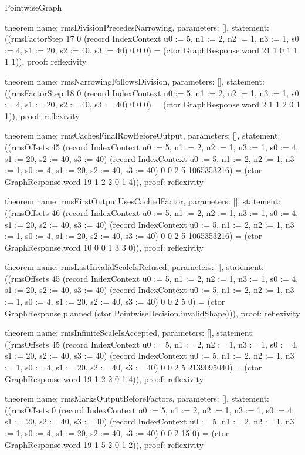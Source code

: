 \begin{lexlean}{PointwiseGraph}
\begin{semanticmodule}
theorem{
  name: rmsDivisionPrecedesNarrowing,
  parameters: [],
  statement: ((rmsFactorStep 17 0 (record IndexContext {u0 := 5, n1 := 2, n2 := 1, n3 := 1, s0 := 4, s1 := 20, s2 := 40, s3 := 40}) 0 0 0) = (ctor GraphResponse.word 21 1 0 1 1 1 1)),
  proof: reflexivity{}
}

theorem{
  name: rmsNarrowingFollowsDivision,
  parameters: [],
  statement: ((rmsFactorStep 18 0 (record IndexContext {u0 := 5, n1 := 2, n2 := 1, n3 := 1, s0 := 4, s1 := 20, s2 := 40, s3 := 40}) 0 0 0) = (ctor GraphResponse.word 2 1 1 2 0 1 1)),
  proof: reflexivity{}
}

theorem{
  name: rmsCachesFinalRowBeforeOutput,
  parameters: [],
  statement: ((rmsOffsets 45 (record IndexContext {u0 := 5, n1 := 2, n2 := 1, n3 := 1, s0 := 4, s1 := 20, s2 := 40, s3 := 40}) (record IndexContext {u0 := 5, n1 := 2, n2 := 1, n3 := 1, s0 := 4, s1 := 20, s2 := 40, s3 := 40}) 0 0 2 5 1065353216) = (ctor GraphResponse.word 19 1 2 2 0 1 4)),
  proof: reflexivity{}
}

theorem{
  name: rmsFirstOutputUsesCachedFactor,
  parameters: [],
  statement: ((rmsOffsets 46 (record IndexContext {u0 := 5, n1 := 2, n2 := 1, n3 := 1, s0 := 4, s1 := 20, s2 := 40, s3 := 40}) (record IndexContext {u0 := 5, n1 := 2, n2 := 1, n3 := 1, s0 := 4, s1 := 20, s2 := 40, s3 := 40}) 0 0 2 5 1065353216) = (ctor GraphResponse.word 10 0 0 1 3 3 0)),
  proof: reflexivity{}
}

theorem{
  name: rmsLastInvalidScaleIsRefused,
  parameters: [],
  statement: ((rmsOffsets 45 (record IndexContext {u0 := 5, n1 := 2, n2 := 1, n3 := 1, s0 := 4, s1 := 20, s2 := 40, s3 := 40}) (record IndexContext {u0 := 5, n1 := 2, n2 := 1, n3 := 1, s0 := 4, s1 := 20, s2 := 40, s3 := 40}) 0 0 2 5 0) = (ctor GraphResponse.planned (ctor PointwiseDecision.invalidShape))),
  proof: reflexivity{}
}

theorem{
  name: rmsInfiniteScaleIsAccepted,
  parameters: [],
  statement: ((rmsOffsets 45 (record IndexContext {u0 := 5, n1 := 2, n2 := 1, n3 := 1, s0 := 4, s1 := 20, s2 := 40, s3 := 40}) (record IndexContext {u0 := 5, n1 := 2, n2 := 1, n3 := 1, s0 := 4, s1 := 20, s2 := 40, s3 := 40}) 0 0 2 5 2139095040) = (ctor GraphResponse.word 19 1 2 2 0 1 4)),
  proof: reflexivity{}
}

theorem{
  name: rmsMarksOutputBeforeFactors,
  parameters: [],
  statement: ((rmsOffsets 0 (record IndexContext {u0 := 5, n1 := 2, n2 := 1, n3 := 1, s0 := 4, s1 := 20, s2 := 40, s3 := 40}) (record IndexContext {u0 := 5, n1 := 2, n2 := 1, n3 := 1, s0 := 4, s1 := 20, s2 := 40, s3 := 40}) 0 0 2 15 0) = (ctor GraphResponse.word 19 1 5 2 0 1 2)),
  proof: reflexivity{}
}


\end{semanticmodule}
\end{lexlean}
